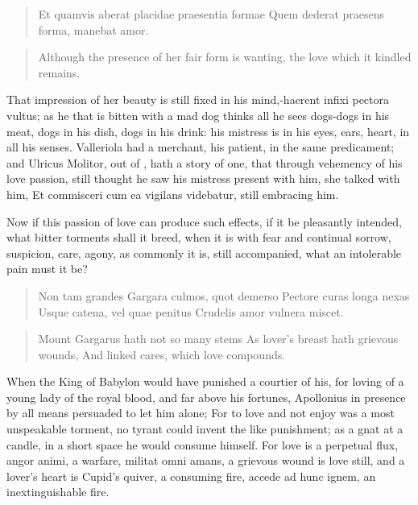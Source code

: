 \begin{latin}
\begin{verse}
Et quamvis aberat placidae praesentia formae
Quem dederat praesens forma, manebat amor.
\end{verse}
\end{latin}
\translationrule%
\begin{verse}%
Although the presence of her fair form is wanting,
  the love which it kindled remains.
\end{verse}%

That impression of her beauty is still fixed in his mind,-haerent
infixi pectora vultus; as he that is bitten with a mad dog thinks all
he sees dogs-dogs in his meat, dogs in his dish, dogs in his drink: his
mistress is in his eyes, ears, heart, in all his senses. Valleriola had
a merchant, his patient, in the same predicament; and Ulricus
Molitor, out of \Austin{}, hath a story of one, that through vehemency of
his love passion, still thought he saw his mistress present with him,
she talked with him, Et commisceri cum ea vigilans videbatur, still
embracing him.

Now if this passion of love can produce such effects, if it be
pleasantly intended, what bitter torments shall it breed, when it is
with fear and continual sorrow, suspicion, care, agony, as commonly it
is, still accompanied, what an intolerable pain must it be?

\begin{latin}
\begin{verse}
Non tam grandes
Gargara culmos, quot demerso
Pectore curas longa nexas
Usque catena, vel quae penitus
Crudelis amor vulnera miscet.
\end{verse}
\end{latin}
\translationrule%
\begin{verse}%
Mount Gargarus hath not so many stems
As lover's breast hath grievous wounds,
And linked cares, which love compounds.
\end{verse}%

When the King of Babylon would have punished a courtier of his, for
loving of a young lady of the royal blood, and far above his fortunes,
 Apollonius in presence by all means persuaded to let him alone;
For to love and not enjoy was a most unspeakable torment, no tyrant
could invent the like punishment; as a gnat at a candle, in a short
space he would consume himself. For love is a perpetual flux,
angor animi, a warfare, militat omni amans, a grievous wound is love
still, and a lover's heart is Cupid's quiver, a consuming fire,
accede ad hunc ignem, \etc{} an inextinguishable fire.

